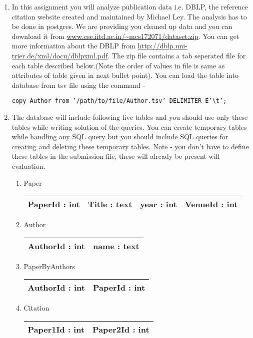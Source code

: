 \documentclass[10pt]{article}
\begin{document}
\begin{enumerate}
\item In this assignment you will analyze publication data i.e. DBLP, the reference citation website created and maintained by Michael Ley. The analysis has to  be done in postgres. We are providing you cleaned up data and you can download it from  \url{www.cse.iitd.ac.in/~mcs172071/dataset.zip}. You can get more information about the DBLP from \url{http://dblp.uni-trier.de/xml/docu/dblpxml.pdf}. The zip file contains a tab seperated file for each table described below.(Note the order of values in file is same as attributes of table given in next bullet point). You can load the table into database from tsv file using the command - 

{\tt copy Author from '/path/to/file/Author.tsv' DELIMITER E'\textbackslash t';}

\item The database will include following five tables and you should use only these tables while writing solution of the queries. You can create temporary tables while handling any SQL query but you should include SQL queries for creating and deleting these temporary tables. Note - you don't have to define these tables in the submission file, these will already be present will evaluation.


\begin{enumerate}
\item Paper\\
        \begin{tabular}{|c|c|c|c|}
            \hline
             PaperId : int & Title : text & year : int & VenueId : int\\
            \hline
        \end{tabular}
\item Author\\
        \begin{tabular}{|c|c|}
            \hline 
             AuthorId : int & name : text \\
            \hline
        \end{tabular}

\item PaperByAuthors\\
        \begin{tabular}{|c|c|}
            \hline 
             AuthorId : int & PaperId : int \\
            \hline
        \end{tabular}
\item Citation\\
        \begin{tabular}{|c|c|}
            \hline 
             Paper1Id : int & Paper2Id : int \\
            \hline
        \end{tabular}


\end{enumerate}
\end{enumerate}
\end{document}
